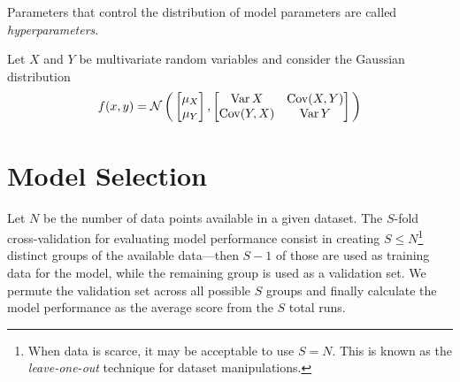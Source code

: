 \begin{definition}[Hyperparameters]
\label{def:hyperparameters}
Parameters that control the distribution of model parameters are called
\emph{hyperparameters}.
\end{definition}

Let \(X\) and \(Y\) be multivariate random variables and consider the
Gaussian distribution
\[
f(x, y) = \operatorname{\mathcal{N}}\bigg(
\begin{bmatrix}
  \mu_X \\
  \mu_Y
\end{bmatrix},
\begin{bmatrix}
  \operatorname{Var} X     & \operatorname{Cov}(X, Y) \\
  \operatorname{Cov}(Y, X) & \operatorname{Var} Y
\end{bmatrix}
\bigg)
\]

\section{Model Selection}

\begin{definition}
\label{def:s-fold-cross-validation}
Let \(N\) be the number of data points available in a given dataset. The
\(S\)-fold cross-validation for evaluating model performance consist in creating
\(S \leq N\)\footnote{When data is scarce, it may be acceptable to use
  \(S = N\). This is known as the \emph{leave-one-out} technique for dataset
  manipulations.} distinct groups of the available data---then \(S-1\) of those
are used as training data for the model, while the remaining group is used as a
validation set. We permute the validation set across all possible \(S\) groups
and finally calculate the model performance as the average score from the \(S\)
total runs.
\end{definition}

